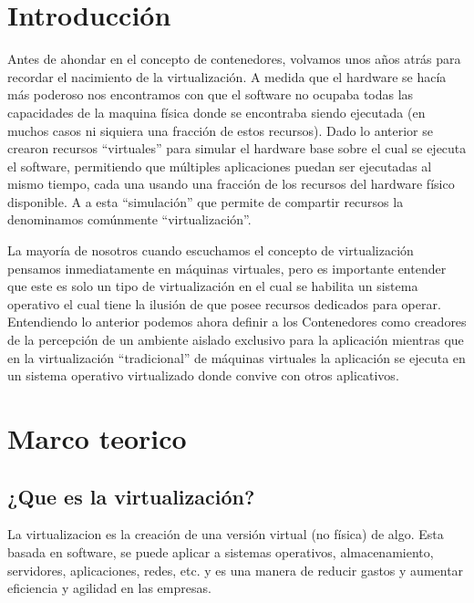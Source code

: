 \documentclass[preprint,12pt]{elsarticle}
\begin{document}



\section{Introducción} 

Antes de ahondar en el concepto de contenedores, volvamos unos años atrás para recordar el nacimiento de la virtualización. A medida que el hardware se hacía más poderoso nos encontramos con que el software no ocupaba todas las capacidades de la maquina física donde se encontraba siendo ejecutada (en muchos casos ni siquiera una fracción de estos recursos). Dado lo anterior se crearon recursos “virtuales” para simular el hardware base sobre el cual se ejecuta el software, permitiendo que múltiples aplicaciones puedan ser ejecutadas al mismo tiempo, cada una usando una fracción de los recursos del hardware físico disponible. A a esta “simulación” que permite de compartir recursos la denominamos comúnmente “virtualización”.

La mayoría de nosotros cuando escuchamos el concepto de virtualización pensamos inmediatamente en máquinas virtuales, pero es importante entender que este es solo un tipo de virtualización en el cual se habilita un sistema operativo el cual tiene la ilusión de que posee recursos dedicados para operar. Entendiendo lo anterior podemos ahora definir a los Contenedores como creadores de la percepción de un ambiente aislado exclusivo para la aplicación mientras que en la virtualización “tradicional” de máquinas virtuales la aplicación se ejecuta en un sistema operativo virtualizado donde convive con otros aplicativos.





\section{Marco teorico}

\subsection{¿Que es la virtualización?}
La virtualizacion es la creación de una versión virtual (no física) de algo. Esta basada en software, se puede aplicar a sistemas operativos, almacenamiento, servidores, aplicaciones, redes, etc. y es una manera de reducir gastos y aumentar eficiencia y agilidad en las empresas.
\end{document}
